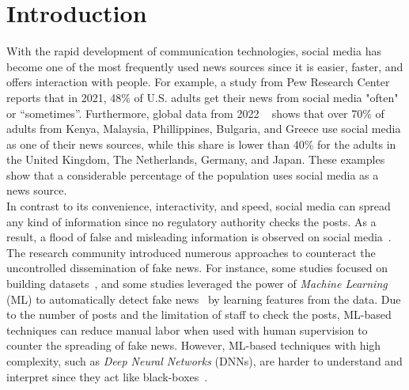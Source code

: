 
\chapter{Introduction}\label{chapter:introduction}

With the rapid development of communication technologies, social media has become one of the most frequently used news sources since
it is easier, faster, and offers interaction with people.
For example, a study from Pew Research Center ~\parencite{NewsConsumptionAcrossSocialMedia_pewresearch}
reports that in 2021, 48\% of U.S. adults get their news from social media "often" or “sometimes”. Furthermore, global data from 2022
~\parencite{StatistaUsageOfSocialMedia_Watson} shows that over 70\% of adults from Kenya, Malaysia,
Phillippines, Bulgaria, and Greece use social media as one of their news sources, while this share is lower than 40\% for the
adults in the United Kingdom, The Netherlands, Germany, and Japan. These examples show that a considerable percentage of the population uses
social media as a news source.\\
In contrast to its convenience, interactivity, and speed, social media can spread any kind of information since no regulatory authority
checks the posts. As a result, a flood of false and misleading information is observed on social
media~\parencite{SocialMediaAndFakeNewsIn2016Election_Allcott}.\\
The research community introduced numerous approaches to counteract the uncontrolled dissemination of fake news. For instance, some studies
focused on building datasets~\parencite{FakeNewsDetectionOnSocialMediaADataMiningPerspective_Shu, LiarLiarPantsOnFire_Wang, FakeReddit_Nakamura, SomeLikeItHoaxDataset_Tacchini, BuzzfaceDataset_Santia, UPFD_Dataset_Shu}, and some studies leveraged the power of \emph{Machine Learning} (ML) to
automatically detect fake news~\parencite{FakeNewsDetectionUsingGeometricDeepLearning_Monti, GraphNeuralNetworksWithContinualLearningFakeNewsDetection_Han, RumorDetectionBidirectionalGraphConvolutionalNetworks_Bian, SAFEFND_Zhou}
by learning features from the data. Due to the number of posts and the limitation of staff to check the posts, ML-based techniques can reduce manual labor when used with human supervision to counter the spreading of fake news. However, ML-based techniques with high complexity, such as \emph{Deep Neural Networks} (DNNs), are harder to understand and interpret since they act like black-boxes~\parencite{CanWeOpenTheBlackBoxOfAI_Castelvecchi}.\\
